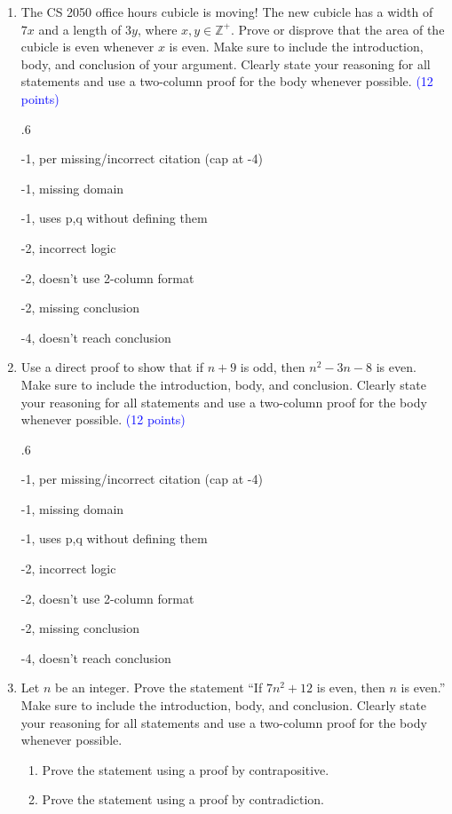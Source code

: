 \documentclass{article}
\newcommand{\pt}[1]{\textcolor{blue}{(#1 points)}}
\newenvironment{rubric}
{
\par
\begin{spacing}{.6}
\begin{itshape}
\color{red}

}
{
\end{itshape}
\end{spacing}
\par
}
\begin{document}
\begin{enumerate}
\begin{rubric}
-4, incorrect predicate declarations

-2, incorrect logical equivalence/citation

-6, doesn't reach conclusion
\end{rubric}

\item The CS 2050 office hours cubicle is moving! The new cubicle has a width of $7x$ and a length of $3y$, where $x, y \in \mathbb{Z}^+$. Prove or disprove that the area of the cubicle is even whenever $x$ is even. Make sure to include the introduction, body, and conclusion of your argument. Clearly state your reasoning for all statements and use a two-column proof for the body whenever possible. \pt{12}

\begin{rubric}
-1, per missing/incorrect citation (cap at -4)

-1, missing domain

-1, uses p,q without defining them

-2, incorrect logic

-2, doesn't use 2-column format

-2, missing conclusion

-4, doesn't reach conclusion
\end{rubric}

\item Use a direct proof to show that if $n + 9$ is odd, then $n^2-3n-8$ is even. Make sure to include the introduction, body, and conclusion. Clearly state your reasoning for all statements and use a two-column proof for the body whenever possible. \pt{12}

\begin{rubric}
-1, per missing/incorrect citation (cap at -4)

-1, missing domain

-1, uses p,q without defining them

-2, incorrect logic

-2, doesn't use 2-column format

-2, missing conclusion

-4, doesn't reach conclusion
\end{rubric}

\item Let $n$ be an integer. Prove the statement “If $7n^2 + 12$ is even, then $n$ is even.” Make sure to include the introduction, body, and conclusion. Clearly state your reasoning for all statements and use a two-column proof for the body whenever possible. 
\begin{enumerate}
    \item Prove the statement using a proof by contrapositive.
    \item Prove the statement using a proof by contradiction.
\end{enumerate}


\end{enumerate}
\end{document}
